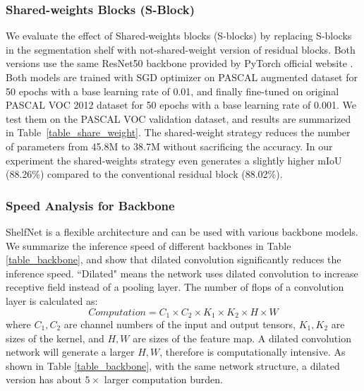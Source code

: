 \documentclass[10pt,twocolumn,letterpaper]{article}
\begin{document}
\subsubsection{Shared-weights Blocks (S-Block)}
\label{sec_share_weight}
We evaluate the effect of Shared-weights blocks (S-blocks) by replacing S-blocks in the segmentation shelf with not-shared-weight version of residual blocks. Both versions use the same ResNet50 backbone provided by PyTorch official website \cite{paszke2017automatic}. Both models are trained with SGD optimizer on PASCAL augmented dataset for 50 epochs with a base learning rate of 0.01, and finally fine-tuned on original PASCAL VOC 2012 dataset for 50 epochs with a base learning rate of 0.001. We test them on the PASCAL VOC validation dataset, and results are summarized in Table~\ref{table_share_weight}. The shared-weight strategy reduces the number of parameters from 45.8M to 38.7M without sacrificing the accuracy.  In our experiment the shared-weights strategy even generates a slightly higher mIoU (88.26\%) compared to the conventional residual block (88.02\%).





\subsubsection{Speed Analysis for Backbone}
ShelfNet is a flexible architecture and can be used with various backbone models. We summarize the inference speed of different backbones in Table \ref{table_backbone}, and show that dilated convolution significantly reduces the inference speed. 
``Dilated" means the network uses dilated convolution to increase receptive field instead of a pooling layer. The number of flops of a convolution layer is calculated as:
\begin{equation}
Computation = C_1 \times C_2 \times K_1 \times K_2 \times H \times W
\end{equation}
where $C_1,C_2$ are channel numbers of the input and output tensors, $K_1,K_2$ are sizes of the kernel, and $H,W$ are sizes of the feature map. A dilated convolution network will generate a larger $H,W$, therefore is computationally intensive. As shown in Table \ref{table_backbone}, with the same network structure, a dilated version has about $5\times$ larger computation burden.
\end{document}
